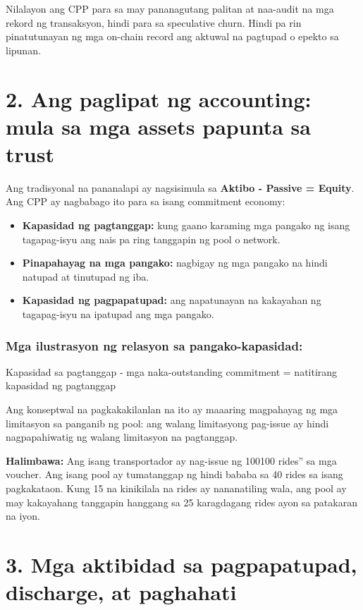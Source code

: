 \documentclass[11pt]{article}
\begin{document}
Nilalayon ang CPP para sa may pananagutang palitan at naa-audit na mga rekord ng transaksyon, hindi para sa speculative churn. Hindi pa rin pinatutunayan ng mga on-chain record ang aktuwal na pagtupad o epekto sa lipunan.


\section*{2. Ang paglipat ng accounting: mula sa mga assets papunta sa trust}

Ang tradisyonal na pananalapi ay nagsisimula sa \textbf{Aktibo - Passive = Equity}. Ang CPP ay nagbabago ito para sa isang commitment economy:

\begin{itemize}[leftmargin=*]
\item \textbf{Kapasidad ng pagtanggap:} kung gaano karaming mga pangako ng isang tagapag-isyu ang nais pa ring tanggapin ng pool o network.
\item \textbf{Pinapahayag na mga pangako:} nagbigay ng mga pangako na hindi natupad at tinutupad ng iba.
\item \textbf{Kapasidad ng pagpapatupad:} ang napatunayan na kakayahan ng tagapag-isyu na ipatupad ang mga pangako.
\end{itemize}
\subsubsection*{Mga ilustrasyon ng relasyon sa pangako-kapasidad:}

Kapasidad sa pagtanggap - mga naka-outstanding commitment = natitirang kapasidad ng pagtanggap

Ang konseptwal na pagkakakilanlan na ito ay maaaring magpahayag ng mga limitasyon sa panganib ng pool: ang walang limitasyong pag-issue ay hindi nagpapahiwatig ng walang limitasyon na pagtanggap.

\textbf{Halimbawa:} Ang isang transportador ay nag-issue ng 100100 rides'' sa mga voucher. Ang isang pool ay tumatanggap ng hindi bababa sa 40 rides sa isang pagkakataon. Kung 15 na kinikilala na rides ay nananatiling wala, ang pool ay may kakayahang tanggapin hanggang sa 25 karagdagang rides ayon sa patakaran na iyon.



\section*{3. Mga aktibidad sa pagpapatupad, discharge, at paghahati}
\end{document}
